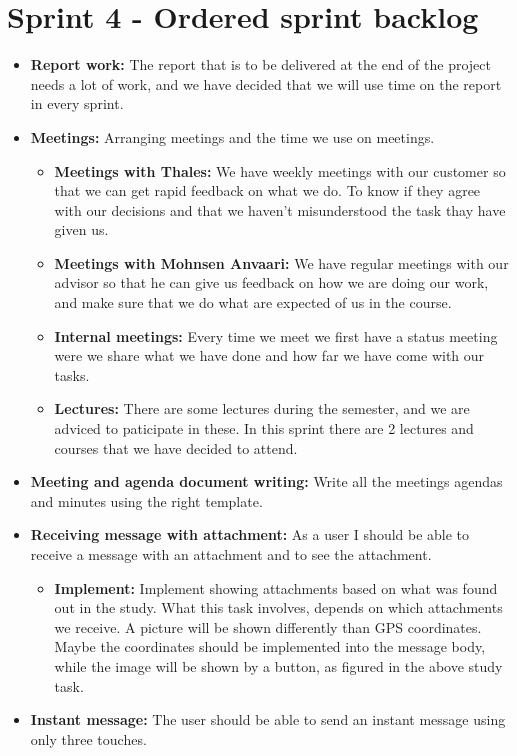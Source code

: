 \section{Sprint 4 - Ordered sprint backlog}

\begin{itemize}
\item{}\textbf{Report work:} The report that is to be delivered at the end of the project needs a lot of work, and we have decided that we will use time on the report in every sprint.
\item{}\textbf{Meetings:} Arranging meetings and the time we use on meetings.
\begin{itemize}
\item{}\textbf{Meetings with Thales:} We have weekly meetings with our customer so that we can get rapid feedback on what we do. To know if they agree with our decisions and that we haven't misunderstood the task thay have given us.
\item{}\textbf{Meetings with Mohnsen Anvaari:} We have regular meetings with our advisor so that he can give us feedback on how we are doing our work, and make sure that we do what are expected of us in the course.
\item{}\textbf{Internal meetings:} Every time we meet we first have a status meeting were we share what we have done and how far we have come with our tasks.
\item{}\textbf{Lectures:} There are some lectures during the semester, and we are adviced to paticipate in these. In this sprint there are 2 lectures and courses that we have decided to attend.
\end{itemize}
\item{}\textbf{Meeting and agenda document writing:} Write all the meetings agendas and minutes using the right template.
\item{}\textbf{Receiving message with attachment:} As a user I should be able to receive a message with an attachment and to see the attachment.
\begin{itemize}
\item{}\textbf{Implement:} Implement showing attachments based on what was found out in the study. What this task involves, depends on which attachments we receive. A picture will be shown differently than GPS coordinates. Maybe the coordinates should be implemented into the message body, while the image will be shown by a button, as figured in the above study task.
\end{itemize}
\item{}\textbf{Instant message:} The user should be able to send an instant message using only three touches.

\end{itemize}
